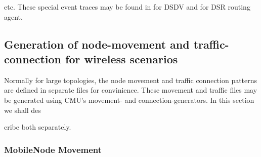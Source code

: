 etc. These special event traces may be found in  for DSDV and  for DSR routing agent.


\subsection{Generation of node-movement and traffic-connection for wireless scenarios}
\label{sec:mobile-scen-generator}

Normally for large topologies, the node movement and traffic connection patterns are defined in separate files for convinience. These movement and traffic files may be generated using CMU's movement- and connection-generators. In this section we shall des









cribe both separately.


\subsubsection{MobileNode Movement}
\label{sec:mobile-movement-file}

